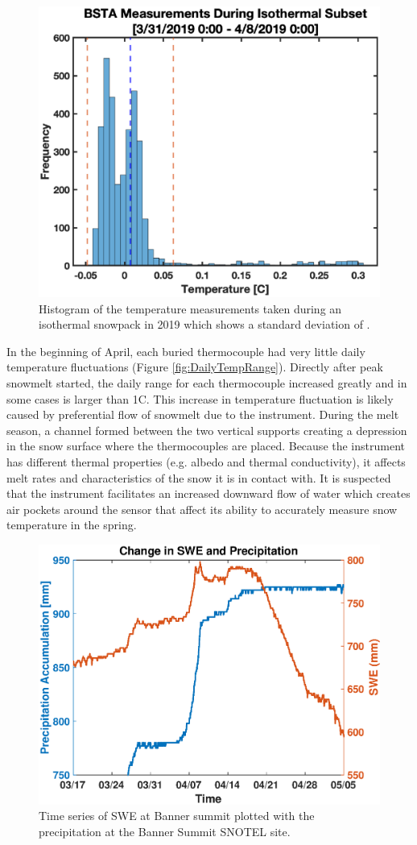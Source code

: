 \begin{figure}[H]
    \centering
    \includegraphics[width=0.7\linewidth]{figures/Uncertainty/Isothermal_Temp_Hist.eps}
    \caption{Histogram of the temperature measurements taken during an isothermal snowpack in 2019 which shows a standard deviation of \isostd.}
    \label{fig:Iso_Temp_Hist}
\end{figure}

In the beginning of April, each buried thermocouple had very little daily temperature fluctuations (Figure \ref{fig:DailyTempRange}). Directly after peak snowmelt started, the daily range for each thermocouple increased greatly and in some cases is larger than 1\textdegree C. This increase in temperature fluctuation is likely caused by preferential flow of snowmelt due to the instrument. During the melt season, a channel formed between the two vertical supports creating a depression in the snow surface where the thermocouples are placed. Because the instrument has different thermal properties (e.g. albedo and thermal conductivity), it affects melt rates and characteristics of the snow it is in contact with. It is suspected that the instrument facilitates an increased downward flow of water which creates air pockets around the sensor that affect its ability to accurately measure snow temperature in the spring. 

\begin{figure}[H]
    \centering
    \includegraphics[width=0.7\linewidth]{figures/TCArray/SWE_Precip_LateSeason.eps}
    \caption{Time series of SWE at Banner summit plotted with the precipitation at the Banner Summit SNOTEL site.}
    \label{fig:SWE_SNTLPrecip}
\end{figure}

